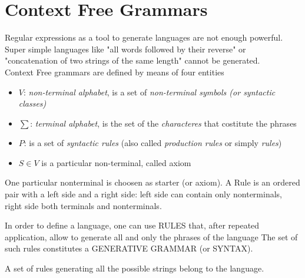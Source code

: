 \chapter{Context Free Grammars}
	Regular expressions as a tool to generate languages are not enough powerful. 
	Super simple languages like "all words followed by their reverse" or "concatenation of two strings of the same length" cannot be generated.\\
	Context Free grammars are defined by means of four entities
	\begin{itemize}
		\item $V$: \emph{non-terminal alphabet}, is a set of \emph{non-terminal symbols (or syntactic classes)}
		\item $\sum$: \emph{terminal alphabet}, is the set of the \emph{characteres} that costitute the phrases
		\item $P$: is a set of \emph{syntactic rules} (also called \emph{production rules} or simply \emph{rules})
		\item $S \in V$ is a particular non-terminal, called axiom
	\end{itemize}
	One particular nonterminal is choosen as starter (or axiom).
	A Rule is an ordered pair with a left side and a right side: left side can contain only nonterminals, right side both terminals and nonterminals. 
	
	In order to define a language, one can use RULES that, after repeated application, allow to generate all and only the phrases of the language
	The set of such rules constitutes a GENERATIVE GRAMMAR (or SYNTAX).

	\begin{definition}
		A set of rules generating all the possible strings belong to the language.
	\end{definition}


